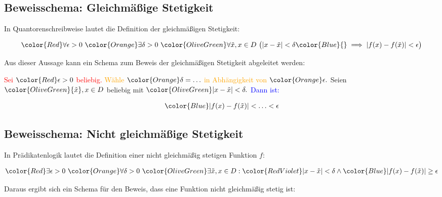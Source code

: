 \documentclass[fontsize=9pt,
               parskip=half-,
               DIV=14,
               listof=chapterentry,
               tocflat]{scrbook}
\begin{document}
\subsection{Beweisschema: Gleichmäßige Stetigkeit}

In Quantorenschreibweise lautet die Definition der gleichmäßigen Stetigkeit:

\begin{align*}
{\color {Red}\forall \epsilon >0}\ {\color {Orange}\exists \delta >0}\ {\color {OliveGreen}\forall {\tilde {x}},x\in D\ {\big (}|x-{\tilde {x}}|<\delta }{\color {Blue}{}\implies |f(x)-f({\tilde {x}})|<\epsilon {\big )}}
\end{align*}

Aus dieser Aussage kann ein Schema zum Beweis der gleichmäßigen Stetigkeit abgeleitet werden:

\begin{importantparagraph*}
{\textcolor{Red}{Sei ${\color {Red}\epsilon >0}$ beliebig.}} {\textcolor{Orange}{Wähle ${\color {Orange}\delta =\ldots }$ in Abhängigkeit von ${\color {Orange}\epsilon .}$}} {\textcolor{OliveGreen}{Seien ${\color {OliveGreen}{\tilde {x}},x\in D}$ beliebig mit ${\color {OliveGreen}|x-{\tilde {x}}|<\delta .}$}} {\textcolor{Blue}{Dann ist:}}

\begin{align*}
{\color {Blue}|f(x)-f({\tilde {x}})|<\ldots <\epsilon }
\end{align*}

\end{importantparagraph*}

\subsection{Beweisschema: Nicht gleichmäßige Stetigkeit}

In Prädikatenlogik lautet die Definition einer nicht gleichmäßig stetigen Funktion $f$:

\begin{align*}
{\color {Red}\exists \epsilon >0}\ {\color {Orange}\forall \delta >0}\ {\color {OliveGreen}\exists {\tilde {x}},x\in D}:{\color {RedViolet}|x-{\tilde {x}}|<\delta }\land {\color {Blue}|f(x)-f({\tilde {x}})|\geq \epsilon }
\end{align*}

Daraus ergibt sich ein Schema für den Beweis, dass eine Funktion nicht gleichmäßig stetig ist:
\end{document}
